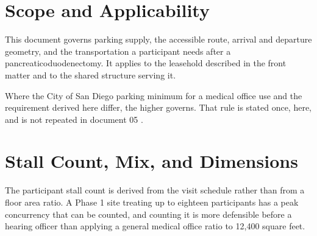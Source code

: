 
\section{Scope and Applicability}

This document governs parking supply, the accessible route, arrival and
departure geometry, and the transportation a participant needs after a
pancreaticoduodenectomy. It applies to the leasehold described in the front
matter and to the shared structure serving it.

Where the City of San Diego parking minimum for a medical office use and the
requirement derived here differ, the higher governs. That rule is stated once,
here, and is not repeated in document 05 \cite{sdmc}.

\section{Stall Count, Mix, and Dimensions}

The participant stall count is derived from the visit schedule rather than from
a floor area ratio. A Phase 1 site treating up to eighteen participants has a
peak concurrency that can be counted, and counting it is more defensible before
a hearing officer than applying a general medical office ratio to 12,400 square
feet.

